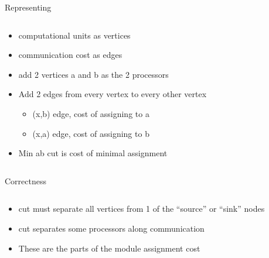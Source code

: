 \documentclass{beamer}
\begin{document}
\begin{frame}{Representing}
\begin{columns}
\begin{column}{5cm}
\begin{itemize}
	\item computational units as vertices
	\item communication cost as edges
	\item add 2 vertices a and b as the 2 processors
	\item Add 2 edges from every vertex to every other vertex
	\begin{itemize}
		\item (x,b) edge, cost of assigning to a
		\item (x,a) edge, cost of assigning to b
	\end{itemize}
	\item Min ab cut is cost of minimal assignment
\end{itemize}
\end{column}
\begin{column}{5cm}
\end{column}
\end{columns}
\end{frame}

\begin{frame}{Correctness}
\begin{columns}
\begin{column}{4cm}
\begin{itemize}
	\item cut must separate all vertices from 1 of the ``source'' or ``sink'' nodes
	\item cut separates some processors along communication
	\item These are the parts of the module assignment cost
\end{itemize}
\end{column}
\begin{column}{6cm}
\end{column}
\end{columns}
\end{frame}
\end{document}

